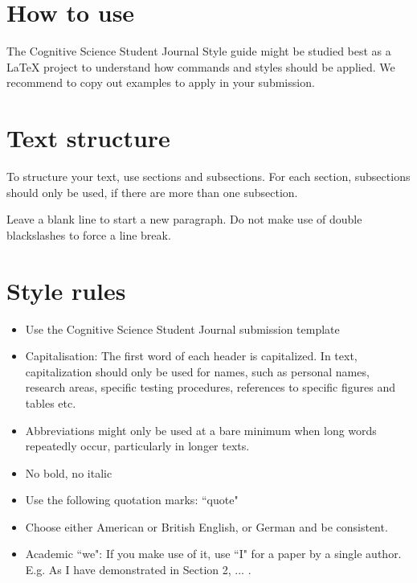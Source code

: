 \documentclass[11pt, twoside]{article}
\newcommand \hex{\small\scaleto{\varhexagonblack}{1.4\LMex}}
\begin{document}


\newpage
\section*{How to use}
The Cognitive Science Student Journal Style guide might be studied best as a LaTeX project to understand how commands and styles should be applied.
We recommend to copy out examples to apply in your submission.

\section{Text structure}
To structure your text, use sections and subsections. For each section, subsections should only be used, if there are more than one subsection.

Leave a blank line to start a new paragraph. Do not make use of double blackslashes to force a line break.

\section{Style rules}
\begin{itemize}
    \item[\hex] Use the Cognitive Science Student Journal submission template
    \item[\hex] Capitalisation: The first word of each header is capitalized. In text, capitalization should only be used for names, such as personal names, research areas, specific testing procedures, references to specific figures and tables etc. 
    \item[\hex] Abbreviations might only be used at a bare minimum when long words repeatedly occur, particularly in longer texts. 
    \item[\hex] No bold, no italic
    \item[\hex] Use the following quotation marks: ``quote"
    \item[\hex] Choose either American or British English, or German and be consistent.
    \item[\hex] Academic ``we": If you make use of it, use ``I" for a paper by a single author. E.g. As I have demonstrated in Section 2, ... .
\end{itemize}
\end{document}
